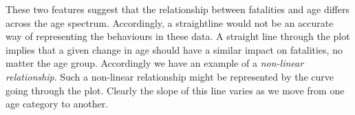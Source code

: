 \newhtmlpage

These two features suggest that the relationship between fatalities and age
differs across the age spectrum. Accordingly, a straightline would not be an
accurate way of representing the behaviours in these data. A straight line
through the plot implies that a given change in age should have a similar
impact on fatalities, no matter the age group. Accordingly we have an
example of a \textit{non-linear relationship}. Such a non-linear
relationship might be represented by the curve going through the plot.
Clearly the slope of this line varies as we move from one age category to
another. 

